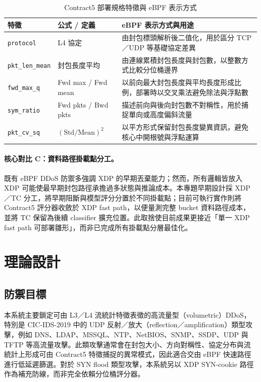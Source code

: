\documentclass[12pt, a4paper, fontset=none]{ctexart}
\newcommand{\code}[1]{\texttt{#1}}
\begin{document}
\begin{table}[H]
  \centering
  \caption{Contract5 部署規格特徵與 eBPF 表示方式}
  \label{tab:features}
  \small
  \renewcommand{\arraystretch}{1.2}
  \setlength{\tabcolsep}{4pt}
  \begin{tabularx}{\textwidth}{>{\raggedright\arraybackslash}p{} >{\raggedright\arraybackslash}p{} X}
    \toprule
    \textbf{特徵} & \textbf{公式 / 定義} & \textbf{eBPF 表示方式與用途} \\
    \midrule
    \code{protocol} & L4 協定 & 由封包標頭解析後二值化，用於區分 TCP／UDP 等基礎協定差異 \\
    \code{pkt\_len\_mean} & 封包長度平均 & 由連線累積封包長度與封包數，以整數方式比較分位桶邊界 \\
    \code{fwd\_max\_q} & Fwd max / Fwd mean & 以前向最大封包長度與平均長度形成比例，部署時以交叉乘法避免除法與浮點數 \\
    \code{sym\_ratio} & Fwd pkts / Bwd pkts & 描述前向與後向封包數不對稱性，用於捕捉單向或高度偏斜流量 \\
    \code{pkt\_cv\_sq} & $(\text{Std} / \text{Mean})^2$ & 以平方形式保留封包長度變異資訊，避免核心中開根號與浮點運算 \\
    \bottomrule
  \end{tabularx}
\end{table}

\paragraph{核心對比 C：資料路徑掛載點分工。}
既有 eBPF DDoS 防禦多強調 XDP 的早期丟棄能力；然而，所有邏輯皆放入 XDP 可能使最早期封包路徑承擔過多狀態與推論成本。本專題早期設計採 XDP／TC 分工，將早期阻斷與模型評分分置於不同掛載點；目前可執行實作則將 Contract5 評分器收斂於 XDP fast path，以便量測完整 bucket 資料路徑成本，並將 TC 保留為後續 classifier 擴充位置。此取捨使目前成果更接近「單一 XDP fast path 可部署雛形」，而非已完成所有掛載點分層最佳化。

\section{理論設計}
\label{sec:theory}

\subsection{防禦目標}
本系統主要鎖定可由 L3／L4 流統計特徵表徵的高流量型（volumetric）DDoS，特別是 CIC-IDS-2019 中的 UDP 反射／放大（reflection／amplification）類型攻擊，例如 DNS、LDAP、MSSQL、NTP、NetBIOS、SNMP、SSDP、UDP 與 TFTP 等高流量攻擊。此類攻擊通常會在封包大小、方向對稱性、協定分布與流統計上形成可由 Contract5 特徵捕捉的異常模式，因此適合交由 eBPF 快速路徑進行低延遲篩選。對於 SYN flood 類型攻擊，本系統另以 XDP SYN-cookie 路徑作為補充防線，而非完全依賴分位桶評分器。
\end{document}
